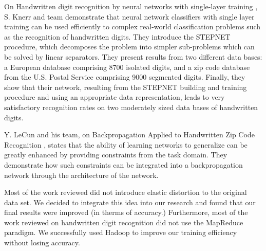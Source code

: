 On Handwritten digit recognition by neural networks with single-layer training \cite{knerr1992handwritten}, S. Knerr and team demonstrate that neural network classifiers with single layer training can be used efficiently to complex real-world classification problems such as the recognition of handwritten digits. They introduce the STEPNET procedure, which decomposes the problem into simpler sub-problems which can be solved by linear separators. They present results from two different data bases: a European database comprising 8700 isolated digits, and a zip code database from the U.S. Postal Service comprising 9000 segmented digits. Finally, they show that their network, resulting from the STEPNET building and training procedure and using an appropriate data representation, leads to very satisfactory recognition rates on two moderately sized data bases of handwritten digits.

Y. LeCun and his team, on Backpropagation Applied to Handwritten Zip Code Recognition \cite{lecun1989backpropagation}, states that the ability of learning networks to generalize can be greatly enhanced by providing constraints from the task domain. 
They demonstrate how such constraints can be integrated into a backpropagation network through the architecture of the network. 

Most of the work reviewed did not introduce elastic distortion to the original data set. We decided to integrate this idea into our research and found that our final results were improved (in therms of accuracy.) Furthermore, most of the work reviewed on handwritten digit recognition did not use the MapReduce paradigm. We successfully used Hadoop to improve our training efficiency without losing accuracy.


